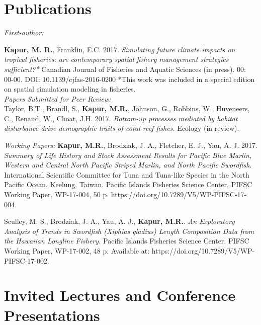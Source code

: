 \documentclass[10pt, letterpaper]{article}
\begin{document}
\section*{Publications}
\noindent \textit{First-author:}

\hangindent=0.5cm \noindent \textbf{Kapur, M. R.}, Franklin, E.C. 2017. \textit{Simulating future climate impacts on tropical fisheries: are contemporary spatial fishery management strategies sufficient?*} Canadian Journal of Fisheries and Aquatic Sciences (in press).  00: 00-00. DOI: 10.1139/cjfas-2016-0200 
*This work was included in a special edition on spatial simulation modeling in fisheries. \\

\noindent \textit{Papers Submitted for Peer Review:}\\
\hangindent=0.5cm \noindent Taylor, B.T., Brandl, S., \textbf{Kapur, M.R.},  Johnson, G., Robbins, W., Huveneers, C., Renaud, W., Choat, J.H. 2017.
\textit{Bottom-up processes mediated by habitat disturbance drive demographic traits of coral-reef fishes.} Ecology (in review).\newline

\noindent \textit{Working Papers:}\newline
\hangindent=0.5cm \noindent  \textbf{Kapur, M.R.},  Brodziak, J. A., Fletcher, E. J., Yau, A. J. 2017. \textit{Summary of Life History and Stock Assessment Results for Pacific Blue Marlin, Western and Central North Pacific Striped Marlin, and North Pacific Swordfish}. International Scientific Committee for Tuna and Tuna-like Species in the North Pacific Ocean. Keelung, Taiwan.  Pacific Islands Fisheries Science Center, PIFSC Working Paper, WP-17-004, 50 p. https://doi.org/10.7289/V5/WP-PIFSC-17-004. \newline\newline

\hangindent=0.5cm \noindent  Sculley, M. S., Brodziak, J. A., Yau, A. J., \textbf{Kapur, M.R.}.  \textit{An Exploratory Analysis of Trends in Swordfish (Xiphias gladius) Length Composition Data from the Hawaiian Longline Fishery.} Pacific Islands Fisheries Science Center, PIFSC Working Paper, WP-17-002, 48 p.  Available at: https://doi.org/10.7289/V5/WP-PIFSC-17-002. \\

\section*{Invited Lectures and Conference Presentations}
\end{document}
